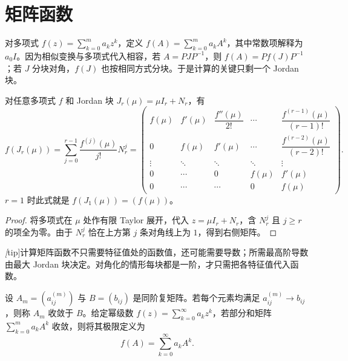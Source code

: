 \section{矩阵函数}
\label{sec:xie-matrix-functions}

对多项式 $f(z)=\sum_{k=0}^m a_kz^k$，定义 $f(A)=\sum_{k=0}^m a_kA^k$，其中常数项解释为 $a_0I$。因为相似变换与多项式代入相容，若 $A=PJP^{-1}$，则 $f(A)=Pf(J)P^{-1}$；若 $J$ 分块对角，$f(J)$ 也按相同方式分块。于是计算的关键只剩一个 Jordan 块。

\begin{proposition}
\label{prop:xie-jordan-polynomial-function}
对任意多项式 $f$ 和 Jordan 块 $J_r(\mu)=\mu I_r+N_r$，有
\begin{equation}
\label{eq:xie-jordan-function}
    f(J_r(\mu))=\sum_{j=0}^{r-1}\frac{f^{(j)}(\mu)}{j!}N_r^j
    =\begin{pmatrix}
        f(\mu)&f'(\mu)&\dfrac{f''(\mu)}{2!}&\cdots&\dfrac{f^{(r-1)}(\mu)}{(r-1)!}\\
        0&f(\mu)&f'(\mu)&\cdots&\dfrac{f^{(r-2)}(\mu)}{(r-2)!}\\
        \vdots&\ddots&\ddots&\ddots&\vdots\\
        0&\cdots&0&f(\mu)&f'(\mu)\\
        0&\cdots&\cdots&0&f(\mu)
    \end{pmatrix}.
\end{equation}
$r=1$ 时此式就是 $f(J_1(\mu))=(f(\mu))$。
\end{proposition}
\begin{proof}
将多项式在 $\mu$ 处作有限 Taylor 展开，代入 $z=\mu I_r+N_r$，含 $N_r^j$ 且 $j\ge r$ 的项全为零。由于 $N_r^j$ 恰在上方第 $j$ 条对角线上为 $1$，得到右侧矩阵。
\end{proof}

\emph[tip]{计算矩阵函数不只需要特征值处的函数值，还可能需要导数；所需最高阶导数由最大 Jordan 块决定。}对角化的情形每块都是一阶，才只需把各特征值代入函数。

\begin{definition}
\label{def:xie-matrix-series}
设 $A_m=(a_{ij}^{(m)})$ 与 $B=(b_{ij})$ 是同阶复矩阵。若每个元素均满足 $a_{ij}^{(m)}\to b_{ij}$，则称 $A_m$ 收敛于 $B$。给定幂级数 $f(z)=\sum_{k=0}^{\infty}a_kz^k$，若部分和矩阵 $\sum_{k=0}^m a_kA^k$ 收敛，则将其极限定义为
\begin{equation}
\label{eq:xie-matrix-power-series}
    f(A)=\sum_{k=0}^{\infty}a_kA^k.
\end{equation}
\end{definition}

